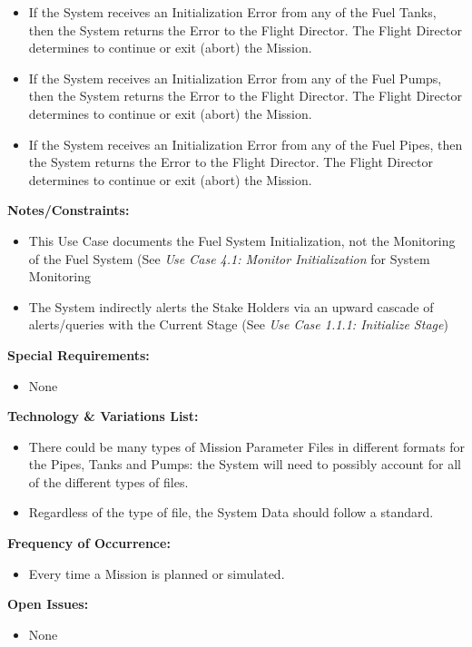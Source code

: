 \documentclass[letterpaper]{article}
\begin{document}
\begin{itemize}
   \item[2a]If the System receives an Initialization Error from any
      of the Fuel Tanks, then the System returns the Error to the 
      Flight Director.  The Flight Director determines to continue or
      exit (abort) the Mission.
   \item[3a]If the System receives an Initialization Error from any 
      of the Fuel Pumps, then the System returns the Error to the 
      Flight Director.  The Flight Director determines to continue or
      exit (abort) the Mission.
   \item[4a]If the System receives an Initialization Error from any 
      of the Fuel Pipes, then the System returns the Error to the 
      Flight Director.  The Flight Director determines to continue 
      or exit (abort) the Mission.
\end{itemize}
\textbf{Notes/Constraints:}
\begin{itemize}
   \item[*a]This Use Case documents the Fuel System Initialization,
      not the Monitoring of the Fuel System (See 
      \textit{Use Case 4.1:  Monitor Initialization} for System 
      Monitoring
   \item[5a]The System indirectly alerts the Stake Holders via an
      upward cascade of alerts/queries with the Current Stage (See 
      \textit{Use Case 1.1.1:  Initialize Stage})
\end{itemize}
\textbf{Special Requirements:}
\begin{itemize}
   \item None
\end{itemize}
\textbf{Technology  \& Variations List:}
\begin{itemize}
   \item There could be many types of Mission Parameter Files in
      different formats for the Pipes, Tanks and Pumps:  the System 
      will need to possibly account for all of the different types of
      files.
   \item Regardless of the type of file, the System Data should
      follow a standard.
\end{itemize}
\textbf{Frequency of Occurrence:}
\begin{itemize}
   \item Every time a Mission is planned or simulated.
\end{itemize}
\textbf{Open Issues:}
\begin{itemize}
   \item None
\end{itemize}
\end{document}

